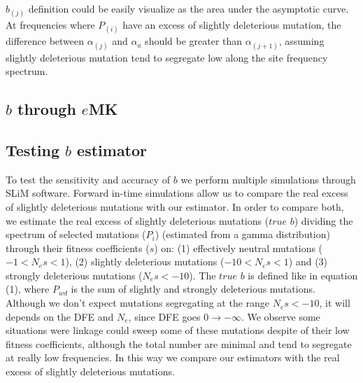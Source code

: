 \documentclass[11pt]{article}
\begin{document}
$b_{(j)}$ definition could be easily visualize as the area under the asymptotic curve. At frequencies where $P_{(i)}$ have an excess of slightly deleterious mutation, the difference between $\alpha_{(j)}$ and $\alpha_{a}$ should be greater than $\alpha_{(j+1)}$, assuming slightly deleterious mutation tend to segregate low along the site frequency spectrum.

\begin{figure}
	\centering	
	\scalebox{0.4}{}
\end{figure}

\subsection{$b$ through $e$MK}


\subsection{Testing $b$ estimator}
To test the sensitivity and accuracy of $b$ we perform multiple simulations through SLiM software. Forward in-time simulations allow us to compare the real excess of slightly deleterious mutations with our estimator. In order to compare both, we estimate the real excess of slightly deleterious mutations ($true$ $b$) dividing the spectrum of selected mutations ($P_{i}$) (estimated from a gamma distribution) through their fitness coefficients ($s$) on: (1) effectively neutral mutations ($-1 < N_{e}s < 1$), (2) slightly deleterious mutations ($-10 < N_{e}s < 1$) and (3) strongly deleterious mutations ($N_{e}s < -10$). The $true$ $b$ is defined like in equation (1), where $P_{wd}$ is the sum of slightly and strongly deleterious mutations. Although we don't expect mutations segregating at the range $N_{e}s < -10$, it will depends on the DFE and $N_{e}$, since DFE goes $0 \to -\infty$. We observe some situations were linkage could sweep some of these mutations despite of their low fitness coefficients, although the total number are minimal and tend to segregate at really low frequencies. In this way we compare our estimators with the real excess of slightly deleterious mutations.
\end{document}
